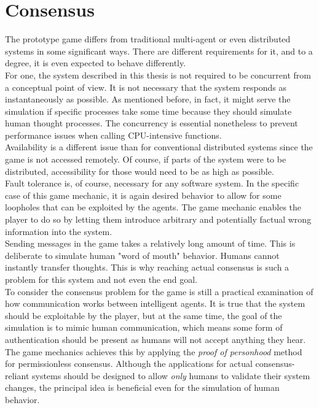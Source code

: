 \section{Consensus}
The prototype game differs from traditional multi-agent or even distributed systems in some significant ways. There are different requirements for it, and to a degree, it is even expected to behave differently.\\
For one, the system described in this thesis is not required to be concurrent from a conceptual point of view. It is not necessary that the system responds as instantaneously as possible. As mentioned before, in fact,  it might serve the simulation if specific processes take some time because they should simulate human thought processes. The concurrency is essential nonetheless to prevent performance issues when calling CPU-intensive functions.\\
Availability is a different issue than for conventional distributed systems since the game is not accessed remotely. Of course, if parts of the system were to be distributed, accessibility for those would need to be as high as possible.\\
Fault tolerance is, of course, necessary for any software system. In the specific case of this game mechanic, it is again desired behavior to allow for some loopholes that can be exploited by the agents. The game mechanic enables the player to do so by letting them introduce arbitrary and potentially factual wrong information into the system.\\
Sending messages in the game takes a relatively long amount of time. This is deliberate to simulate human "word of mouth" behavior. Humans cannot instantly transfer thoughts. This is why reaching actual consensus is such a problem for this system and not even the end goal.\\
To consider the consensus problem for the game is still a practical examination of how communication works between intelligent agents. It is true that the system should be exploitable by the player, but at the same time, the goal of the simulation is to mimic human communication, which means some form of authentication should be present as humans will not accept anything they hear.\\
The game mechanics achieves this by applying the \textit{proof of personhood} method for permissionless consensus. Although the applications for actual consensus-reliant systems should be designed to allow \textit{only} humans to validate their system changes, the principal idea is beneficial even for the simulation of human behavior.\\
